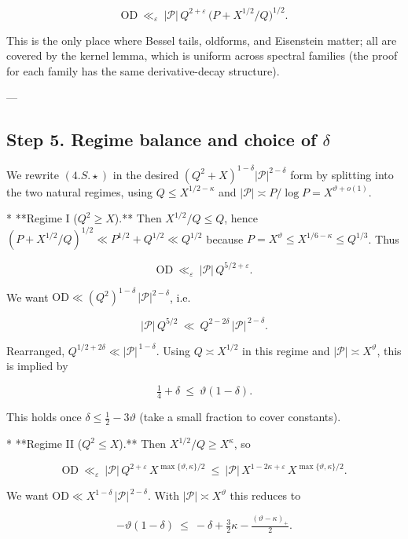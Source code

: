 \documentclass[11pt]{article}
\theoremstyle{definition}
\theoremstyle{remark}
\begin{document}
\begin{equation}
\boxed{\ \ \mathrm{OD}\ \ll_\varepsilon\ |\mathcal P|\,Q^{2+\varepsilon}\,\big(P+X^{1/2}/Q\big)^{1/2}. \ \ }
\tag{4.S.X}
\end{equation}

This is the only place where Bessel tails, oldforms, and Eisenstein matter; all are covered by the kernel lemma, which is uniform across spectral families (the proof for each family has the same derivative-decay structure).

---

\subsection*{Step 5. Regime balance and choice of $\delta$}

We rewrite $(4.S.\!\star)$ in the desired $(Q^2+X)^{1-\delta}|\mathcal P|^{2-\delta}$ form by splitting into the two natural regimes, using $Q\le X^{1/2-\kappa}$ and $|\mathcal P|\asymp P/\log P=X^{\vartheta+o(1)}$.

* **Regime I ($Q^2\ge X$).** Then $X^{1/2}/Q\le Q$, hence $(P+X^{1/2}/Q)^{1/2}\ll P^{1/2}+Q^{1/2}\ll Q^{1/2}$ because $P=X^\vartheta\le X^{1/6-\kappa}\le Q^{1/3}$. Thus

  $$
  \mathrm{OD}\ \ll_\varepsilon\ |\mathcal P|\,Q^{5/2+\varepsilon}.
  $$

  We want $\mathrm{OD}\ll (Q^2)^{1-\delta}\,|\mathcal P|^{2-\delta}$, i.e.

  $$
  |\mathcal P|\,Q^{5/2}\ \ll\ Q^{2-2\delta}\,|\mathcal P|^{\,2-\delta}.
  $$

  Rearranged, $Q^{1/2+2\delta}\ll |\mathcal P|^{\,1-\delta}$. Using $Q\asymp X^{1/2}$ in this regime and $|\mathcal P|\asymp X^\vartheta$, this is implied by

  $$
  \tfrac14+\delta\ \le\ \vartheta(1-\delta).
  $$

  This holds once $\delta\le \tfrac12-3\vartheta$ (take a small fraction to cover constants).

* **Regime II ($Q^2\le X$).** Then $X^{1/2}/Q\ge X^\kappa$, so

  $$
  \mathrm{OD}\ \ll_\varepsilon\ |\mathcal P|\,Q^{2+\varepsilon}\,X^{\max\{\vartheta,\kappa\}/2}
  \ \le\ |\mathcal P|\,X^{1-2\kappa+\varepsilon}\,X^{\max\{\vartheta,\kappa\}/2}.
  $$

  We want $\mathrm{OD}\ll X^{1-\delta}\,|\mathcal P|^{\,2-\delta}$. With $|\mathcal P|\asymp X^\vartheta$ this reduces to

  $$
  -\vartheta(1-\delta)\ \le\ -\delta + \tfrac32\kappa - \tfrac{(\vartheta-\kappa)_+}{2}.
  $$
\end{document}
